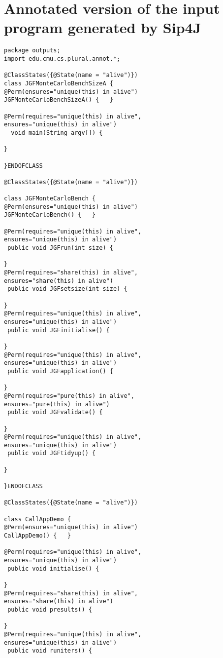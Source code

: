 \documentclass[10pt]{article}
\begin{document}
\section{{\color{Fuchsia}Annotated version of the input program generated by Sip4J}}
\label{annotated-version}
\begin{lstlisting}
package outputs;
import edu.cmu.cs.plural.annot.*;

@ClassStates({@State(name = "alive")})
class JGFMonteCarloBenchSizeA {
@Perm(ensures="unique(this) in alive")
JGFMonteCarloBenchSizeA() {   }

@Perm(requires="unique(this) in alive",
ensures="unique(this) in alive")
  void main(String argv[]) {
 
} 

}ENDOFCLASS

@ClassStates({@State(name = "alive")})

class JGFMonteCarloBench {
@Perm(ensures="unique(this) in alive")
JGFMonteCarloBench() {   }

@Perm(requires="unique(this) in alive",
ensures="unique(this) in alive")
 public void JGFrun(int size) {
 
} 
@Perm(requires="share(this) in alive",
ensures="share(this) in alive")
 public void JGFsetsize(int size) {
 
} 
@Perm(requires="unique(this) in alive",
ensures="unique(this) in alive")
 public void JGFinitialise() {
 
} 
@Perm(requires="unique(this) in alive",
ensures="unique(this) in alive")
 public void JGFapplication() {
 
} 
@Perm(requires="pure(this) in alive",
ensures="pure(this) in alive")
 public void JGFvalidate() {
 
} 
@Perm(requires="unique(this) in alive",
ensures="unique(this) in alive")
 public void JGFtidyup() {
 
} 

}ENDOFCLASS

@ClassStates({@State(name = "alive")})

class CallAppDemo {
@Perm(ensures="unique(this) in alive")
CallAppDemo() {   }

@Perm(requires="unique(this) in alive",
ensures="unique(this) in alive")
 public void initialise() {
 
} 
@Perm(requires="share(this) in alive",
ensures="share(this) in alive")
 public void presults() {
 
} 
@Perm(requires="unique(this) in alive",
ensures="unique(this) in alive")
 public void runiters() {
 

\end{lstlisting}
\end{document}
